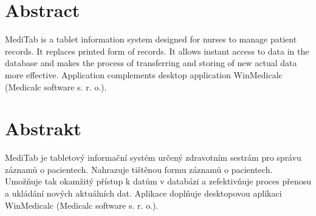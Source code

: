 \section*{Abstract}
MediTab is a tablet information system designed for nurses to manage patient records. It replaces printed form of records. It allows instant access to data in the database and makes the process of transferring and storing of new actual data more effective. Application complements desktop application WinMedicalc (Medicalc software s. r. o.).

\vfill

\section*{Abstrakt}
MediTab je tabletový informační systém určený zdravotním sestrám pro správu záznamů o pacientech. Nahrazuje tištěnou formu záznamů o pacientech. Umožňuje tak okamžitý přístup k datům v databázi a zefektivňuje proces přenosu a ukládání nových aktuálních dat. Aplikace doplňuje desktopovou aplikaci WinMedicalc (Medicalc software s. r. o.).

\vfill